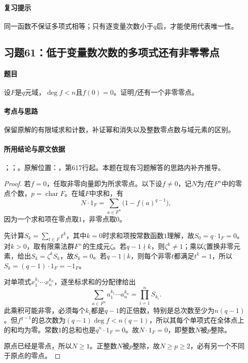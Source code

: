 \paragraph{复习提示}

同一函数不保证多项式相等；只有逐变量次数小于$q$后，才能使用代表唯一性。



\subsection{习题61：低于变量数次数的多项式还有非零零点}

\label{ex:3:61}

\paragraph{题目}

设$F$是$q$元域，$\deg f<n$且$f(0)=0$。证明$f$还有一个非零零点。

\paragraph{考点与思路}

保留原解的有限域求和计数，补证幂和消失以及整数零点数与域元素的区别。

\paragraph{所用结论与原文依据}

；；。原解位置：，第617行起。本题在现有习题解答的思路内补齐推导。


\begin{proof}

若$f=0$，任取非零向量即为所求零点。以下设$f\ne0$，记$N$为$f$在$F^n$中的零点个数，$p=\operatorname{char}F$。在域$F$中求和，有
\[
N\cdot1_F=\sum_{a\in F^n}\bigl(1-f(a)^{q-1}\bigr),
\]
因为一个求和项在零点取$1$，非零点取$0$。

先计算$S_k=\sum_{t\in F}t^k$，其中$k=0$时求和项按常数函数$1$理解，故$S_0=q\cdot1_F=0$。对$k>0$，取有限乘法群$F^\times$的生成元$\zeta$。若$q-1\nmid k$，则$\zeta^k\ne1$；乘以$\zeta$置换非零元素，给出$S_k=\zeta^k S_k$，故$S_k=0$。若$q-1\mid k$，则每个非零$t$都满足$t^k=1$，所以$S_k=(q-1)\cdot1_F=-1_F$。

对单项式$x_1^{k_1}\cdots x_n^{k_n}$，逐坐标求和的分配律给出
\[
\sum_{a\in F^n}a_1^{k_1}\cdots a_n^{k_n}=\prod_{i=1}^n S_{k_i}.
\]
此乘积可能非零，必须每个$k_i$都是$q-1$的正倍数，特别是总次数至少为$n(q-1)$。但$f^{q-1}$的总次数为$(q-1)\deg f<n(q-1)$，所以其每个单项式在全体点上的和均为零。常数$1$的总和也是$q^n\cdot1_F=0$。故$N\cdot1_F=0$，即整数$N$被$p$整除。

原点已经是零点，所以$N\ge1$。正整数$N$被$p$整除，故$N\ge p\ge2$，必有另一个不同于原点的零点。

\end{proof}


